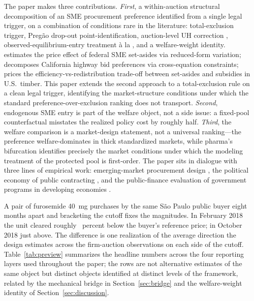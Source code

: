 The paper makes three contributions. \emph{First}, a within-auction structural decomposition of an SME procurement preference identified from a single legal trigger, on a combination of conditions rare in the literature: total-exclusion trigger, Preg\~ao drop-out point-identification, auction-level UH correction \citep{krasnokutskaya2011}, observed-equilibrium-entry treatment \`a la \citet{atheyseira2011}, and a \citet{saezstantcheva2016} welfare-weight identity. \citet{marion2007} estimates the price effect of federal SME set-asides via reduced-form variation; \citet{krasnokutskaya2011} decomposes California highway bid preferences via cross-equation constraints; \citet{athey2013} prices the efficiency-vs-redistribution trade-off between set-asides and subsidies in U.S.\ timber. This paper extends the second approach to a total-exclusion rule on a clean legal trigger, identifying the market-structure conditions under which the standard preference-over-exclusion ranking does not transport. \emph{Second}, endogenous SME entry is part of the welfare object, not a side issue: a fixed-pool counterfactual misstates the realized policy cost by roughly half. \emph{Third}, the welfare comparison is a market-design statement, not a universal ranking---the \optPrefThreshold{} preference welfare-dominates in thick standardized markets, while pharma's bifurcation identifies precisely the market conditions under which the modeling treatment of the protected pool is first-order. The paper sits in dialogue with three lines of empirical work: emerging-market procurement design \citep{decarolis2024, coviello2026, ferraz2016, szerman2023}, the political economy of public contracting \citep{colonnelli2022}, and the public-finance evaluation of government programs in developing economies \citep{best2023, bandiera2021, olken2007}.

A pair of furosemide 40~mg purchases by the same São Paulo public buyer eight months apart and bracketing the cutoff fixes the magnitudes. In February 2018 the unit cleared roughly \furosBelowRefPct~percent below the buyer's reference price; in October 2018 just above. The difference is one realization of the average direction the design estimates across the \nObsAuctions{} firm-auction observations on each side of the \policyCutoffMonth{} cutoff. Table~\ref{tab:preview} summarizes the headline numbers across the four reporting layers used throughout the paper; the rows are not alternative estimates of the same object but distinct objects identified at distinct levels of the framework, related by the mechanical bridge in Section~\ref{sec:bridge} and the welfare-weight identity of Section~\ref{sec:discussion}.

